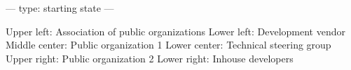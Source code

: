 ---
type: starting state
---

Upper left: Association of public organizations
Lower left: Development vendor
Middle center: Public organization 1
Lower center: Technical steering group
Upper right: Public organization 2
Lower right: Inhouse developers
